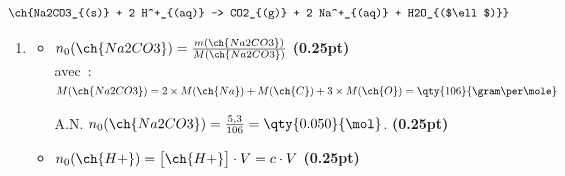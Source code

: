 \[
    \ch{Na2CO3_{(s)} + 2 H^+_{(aq)} -> CO2_{(g)} + 2 Na^+_{(aq)} + H2O_{($\ell$)}}
\]

\begin{enumerate}
    \item
          \begin{itemize}
              \item $n_{0}(\ch{Na2CO3})=
                    \frac{m({\ch{Na2CO3}})}{M(\ch{Na2CO3})}$
                    \hfill\textbf{(0.25pt)} \\
                    avec~:
                    $M(\ch{Na2CO3})=
                    2\times M(\ch{Na})+M(\ch{C})+3\times M(\ch{O})=
                    \qty{106}{\gram\per\mole}$
          
                    A.N. $n_{0}(\ch{Na2CO3})=
                    \frac{5,3}{106}=\qty{0.050}{\mol}$.
                    \hfill\textbf{(0.25pt)}
              \item $n_0(\ch{H+})=\bigl[\ch{H+}\bigr]\cdot V=c\cdot V$
                    \hfill\textbf{(0.25pt)}
          

\end{itemize}
\end{enumerate}
